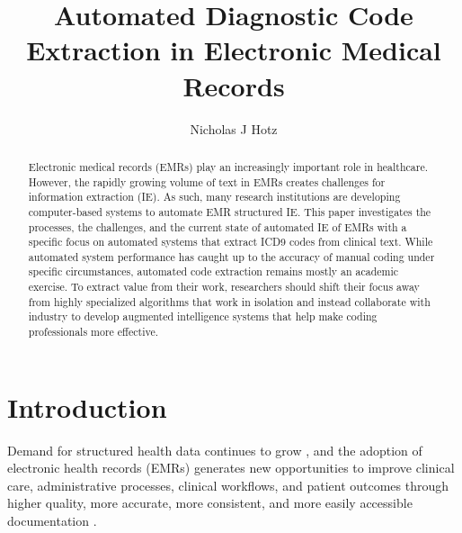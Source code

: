 \documentclass[sigconf]{acmart}
\begin{document}
\title{Automated Diagnostic Code Extraction in Electronic Medical Records}

\author{Nicholas J Hotz}

\begin{abstract}
Electronic medical records (EMRs) play an increasingly important role in healthcare. However, the rapidly growing volume of text in EMRs creates challenges for information extraction (IE). As such, many research institutions are developing computer-based systems to automate EMR structured IE. This paper investigates the processes, the challenges, and the current state of automated IE of EMRs with a specific focus on automated systems that extract ICD9 codes from clinical text. While automated system performance has caught up to the accuracy of manual coding under specific circumstances, automated code extraction remains mostly an academic exercise. To extract value from their work, researchers should shift their focus away from highly specialized algorithms that work in isolation and instead collaborate with industry to develop augmented intelligence systems that help make coding professionals more effective.
\end{abstract}



\maketitle

\section{Introduction}
Demand for structured health data continues to grow \cite{stanfill2010systematic}, and the adoption of electronic health records (EMRs) generates new opportunities to improve clinical care, administrative processes, clinical workflows, and patient outcomes through higher quality, more accurate, more consistent, and more easily accessible documentation \cite{meystre2008extracting} \cite{pons2016natural}.
\end{document}

